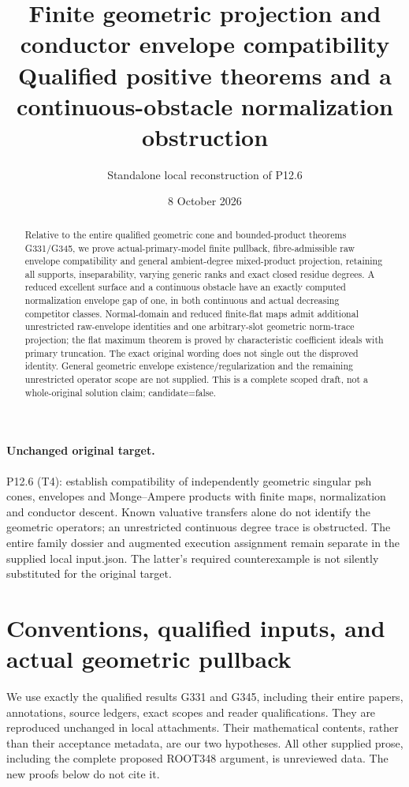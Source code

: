 \documentclass[11pt]{article}
\title{Finite geometric projection and conductor envelope compatibility\\
Qualified positive theorems and a continuous-obstacle normalization obstruction}
\author{Standalone local reconstruction of P12.6}
\date{8 October 2026}
\begin{document}
\maketitle
\begin{abstract}
Relative to the entire qualified geometric cone and bounded-product
theorems G331/G345, we prove actual-primary-model finite pullback,
fibre-admissible raw envelope compatibility and general ambient-degree
mixed-product projection, retaining all supports, inseparability,
varying generic ranks and exact closed residue degrees.
A reduced excellent surface and a continuous obstacle have an exactly
computed normalization envelope gap of one, in both continuous and
actual decreasing competitor classes.
Normal-domain and reduced finite-flat maps admit additional
unrestricted raw-envelope identities and one arbitrary-slot geometric
norm-trace projection; the flat maximum theorem is proved by
characteristic coefficient ideals with primary truncation.
The exact original wording does not single out the disproved identity.
General geometric envelope existence/regularization and the remaining
unrestricted operator scope are not supplied. This is a complete scoped
draft, not a whole-original solution claim; candidate=false.
\end{abstract}
\paragraph{Unchanged original target.}
P12.6 (T4): establish compatibility of independently geometric
singular psh cones, envelopes and Monge--Ampere products with finite
maps, normalization and conductor descent. Known valuative transfers
alone do not identify the geometric operators; an unrestricted
continuous degree trace is obstructed.
The entire family dossier and augmented execution assignment remain
separate in the supplied local input.json. The latter's required
counterexample is not silently substituted for the original target.
\tableofcontents
\newpage
\section{Conventions, qualified inputs, and actual geometric pullback}
\label{sec:pull}
We use exactly the qualified results G331 and G345, including their entire
papers, annotations, source ledgers, exact scopes and reader qualifications.
They are reproduced unchanged in local attachments. Their mathematical
contents, rather than their acceptance metadata, are our two hypotheses.
All other supplied prose, including the complete proposed ROOT348 argument,
is unreviewed data. The new proofs below do not cite it.
\end{document}
